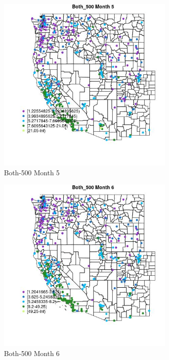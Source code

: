 \begin{figure} 
\centering  
\includegraphics[width=0.77\textwidth]{Code_Outputs/ML_input_report_ML_input_PM25_Step5_part_d_de_duplicated_aves_ML_input_MapObsMo5Both_500.jpg} 
\caption{\label{fig:ML_input_report_ML_input_PM25_Step5_part_d_de_duplicated_aves_ML_inputMapObsMo5Both_500}Both-500 Month 5} 
\end{figure} 
 

\begin{figure} 
\centering  
\includegraphics[width=0.77\textwidth]{Code_Outputs/ML_input_report_ML_input_PM25_Step5_part_d_de_duplicated_aves_ML_input_MapObsMo6Both_500.jpg} 
\caption{\label{fig:ML_input_report_ML_input_PM25_Step5_part_d_de_duplicated_aves_ML_inputMapObsMo6Both_500}Both-500 Month 6} 
\end{figure} 
 

